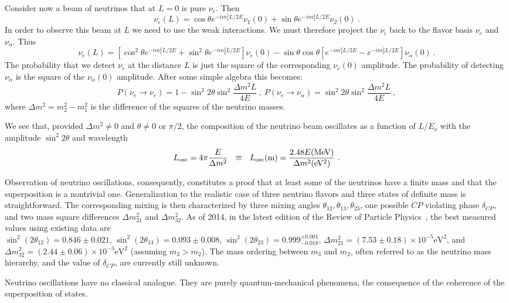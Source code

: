 \documentclass[aps,twocolumn,preprintnumbers,amsmath,superscriptaddress,amssymb,floats,nofootinbib]{revtex4-1}
\begin{document}
{{Consider now a beam of neutrinos that at $L=0$ is pure $\nu_e$. Then
\begin{equation}
\nu_e (L) = \cos \theta e^{-i m_1^2 L/2E} \nu_1(0) + \sin \theta e^{-i m_2^2 L/2E} \nu_2 (0) ~.
\end{equation}
In order to observe this beam at $L$ we need to use the weak interactions.  We must therefore project the $\nu_i$ back to the flavor basis $\nu_e$ and $\nu_{\alpha}$.
Thus
\begin{equation}
\nu_e (L) = [\cos^2 \theta e^{-i m_1^2 L/2E} + \sin^2 \theta e^{-i m_2^2 L/2E}] \nu_e(0) -
\sin \theta \cos \theta [e^{-i m_1^2 L/2E} - e^{-i m_2^2 L/2E}] \nu_{\alpha}(0) ~.
\end{equation}
The probability that we detect $\nu_e$ at the distance $L$ is just the square of the corresponding $\nu_e(0)$ amplitude. The probability
of detecting $\nu_{\alpha}$ is the square of the $\nu_{\alpha}(0)$ amplitude. After some simple algebra this becomes:
\begin{equation}\label{eq:osci}
P(\nu_e \rightarrow \nu_e) = 1 - \sin^2 2 \theta \sin^2 \frac{\Delta m^2 L}{4 E} ~,~ P(\nu_e \rightarrow \nu_{\alpha}) =  \sin^2 2 \theta \sin^2 \frac{\Delta m^2 L}{4 E} ~,
\end{equation}
where $\Delta m^2 = m^2_2 - m^2_1$ is the difference of the squares of the neutrino masses.

We see that, provided $\Delta m^2 \ne 0$ and $\theta \ne 0$ or $\pi/2$, the composition of the neutrino beam oscillates as a function of $L/E_{\nu}$
with the amplitude $\sin^2 2 \theta$ and wavelength
\begin{equation}
L_{\textrm{osc}} = 4 \pi \frac{E}{\Delta m^2} ~~\equiv ~~ L_{\textrm{osc}} ({\rm m}) = \frac{2.48 E {\rm (MeV)}}{ \Delta m^2 {\rm (eV^2)}} ~.
\end{equation}

Observation of neutrino oscillations, consequently, constitutes a proof that at least some of the neutrinos have a finite mass and that the superposition is
a nontrivial one. Generalization to the realistic case of three neutrino flavors and three
states of definite mass is straightforward. The corresponding mixing is then characterized by three mixing angles $\theta_{12}, \theta_{13}, \theta_{23}$,
 one possible $CP$ violating phase $\delta_{CP}$,
and two mass square differences $\Delta m^2_{21}$ and $\Delta m^2_{32}$.
As of 2014, in the latest edition of the Review of Particle Physics~\cite{PDG14}, the best measured values using existing data are $\sin^2(2\theta_{12}) = 0.846 \pm 0.021, \, \sin^2(2\theta_{13}) = 0.093 \pm 0.008, \, \sin^2(2\theta_{23}) = 0.999^{+0.001}_{-0.018}, \, \Delta m^2_{21} = (7.53 \pm 0.18) \times 10^{-5} \textrm{eV}^2$, and $\Delta m^2_{32} = (2.44\pm 0.06) \times 10^{-3} \textrm{eV}^2$ (assuming $m_3 > m_2$). The mass ordering between $m_3$ and $m_2$, often referred to as the neutrino mass hierarchy, and the value of $\delta_{CP}$, are currently still unknown.

Neutrino oscillations have no classical analogue. They are purely quantum-mechanical phenomena, the consequence of the coherence of the
superposition of states.

   }%
}
\end{document}
